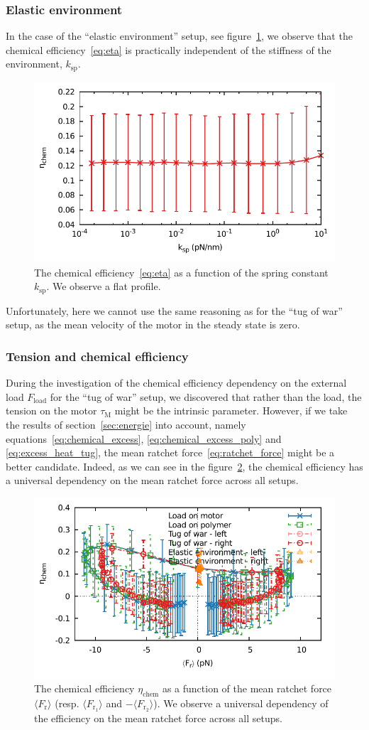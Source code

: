 \documentclass[aps,pre,twocolumn,showpacs,showkeys,superscriptaddress,floatfix]{revtex4-1}
\begin{document}
\subsubsection{Elastic environment}
In the case of the  ``elastic environment'' setup, see figure~\ref{fig:stiffness_efficiency}, we observe that the chemical efficiency~\eqref{eq:eta} is practically independent of the stiffness of the environment, $k_\text{sp}$. 
\begin{figure}[t]
\centering
\includegraphics[width=.45\textwidth,height=!]{k_eta.pdf}
\caption{\label{fig:stiffness_efficiency}
The chemical efficiency~\eqref{eq:eta} as a function of the spring constant $k_\text{sp}$.
We observe a flat profile.
}
\end{figure}
Unfortunately, here we cannot use the same reasoning as for the ``tug of war'' setup, as the mean velocity of the motor in the steady state is zero. 

\subsubsection{Tension and chemical efficiency}
During the investigation of the chemical efficiency dependency on the external load $F_\text{load}$ for the ``tug of war'' setup, 
we discovered that rather than the load, the tension on the motor $\tau_\text{M}$ might be the intrinsic parameter. 
However, if we take the results of section~\ref{sec:energie} into account, namely equations~\eqref{eq:chemical_excess}, \eqref{eq:chemical_excess_poly} and \eqref{eq:excess_heat_tug}, 
the mean ratchet force~\eqref{eq:ratchet_force} might be a better candidate.
Indeed, as we can see in the figure~\ref{fig:ratchet_force_efficiency}, the chemical efficiency has a universal dependency on the mean ratchet force across all setups. 
\begin{figure}[t]
\centering
\includegraphics[width=.45\textwidth,height=!]{ratchet_eta}
\caption{\label{fig:ratchet_force_efficiency}
The chemical efficiency $\eta_\text{chem}$ as a function of the mean ratchet force $\langle F_\text{r} \rangle$ (resp. $\langle F_{\text{r}_1} \rangle$ and $-\langle F_{\text{r}_2} \rangle$).
We observe a universal dependency of the efficiency on the mean ratchet force across all setups. 
}
\end{figure}
\end{document}

